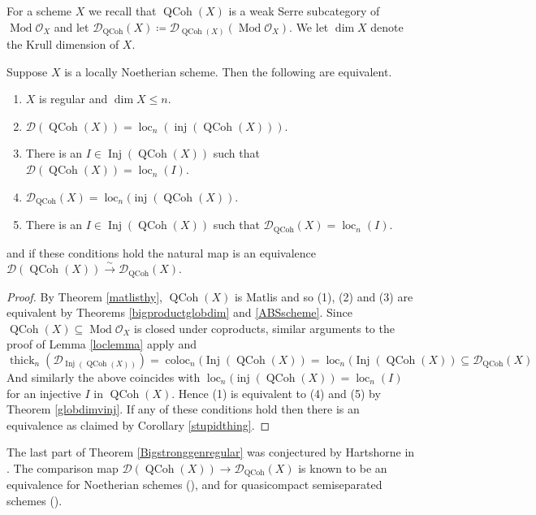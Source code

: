 \documentclass[12pt,oneside]{amsart}
\DeclareMathOperator*{\Inj}{Inj}
\DeclareMathOperator{\coloc}{coloc}
\DeclareMathOperator{\loc}{loc}
\DeclareMathOperator{\thick}{thick}
\DeclareMathOperator{\Mod}{Mod}
\DeclareMathOperator{\QCoh}{QCoh}
\DeclareMathOperator{\inj}{inj}
\begin{document}
For a scheme $X$ we recall that $\QCoh(X)$ is a weak Serre subcategory of $\Mod \mathcal{O}_X$ and let $\mathcal{D}_{\QCoh}(X) \coloneq \mathcal{D}_{\QCoh(X)}(\Mod \mathcal{O}_X)$. We let $\dim X$ denote the Krull dimension of $X$. 


\begin{theorem} \label{Bigstronggenregular}
Suppose $X$ is a locally Noetherian scheme. Then the following are equivalent.

\begin{enumerate}
\item $X$ is regular and $\dim X \leq n$.
\item $\mathcal{D}(\QCoh(X)) = \loc_n(\inj(\QCoh(X)))$.
\item There is an $I \in \Inj(\QCoh(X)) $ such that $\mathcal{D}(\QCoh(X)) = \loc_n(I)$.
\item $\mathcal{D}_{\QCoh}(X) = \loc_n(\inj(\QCoh(X))$.
\item There is an $I \in \Inj(\QCoh(X))$ such that $\mathcal{D}_{\QCoh}(X) = \loc_n(I)$.
\end{enumerate}
and if these conditions hold the natural map is an equivalence $\mathcal{D}(\QCoh(X)) \xrightarrow{\sim} \mathcal{D}_{\QCoh}(X)$.

\end{theorem}

\begin{proof}
By Theorem \ref{matlisthy}, $\QCoh(X)$ is Matlis and so (1), (2) and (3) are equivalent by Theorems \ref{bigproductglobdim} and \ref{ABSscheme}. Since $\QCoh(X) \subseteq \Mod \mathcal{O}_X$ is closed under coproducts, similar arguments to the proof of Lemma \ref{loclemma} apply and 
\[
\thick_n(\mathcal{D}_{\Inj(\QCoh(X))}) = \coloc_n(\Inj(\QCoh(X)) = \loc_n(\Inj(\QCoh(X)) \subseteq \mathcal{D}_{\QCoh}(X)
\]
And similarly the above coincides with $\loc_n(\inj(\QCoh(X)) = \loc_n(I)$ for an injective $I$ in $\QCoh(X)$. Hence (1) is equivalent to (4) and (5) by Theorem \ref{globdimvinj}. If any of these conditions hold then there is an equivalence as claimed by Corollary \ref{stupidthing}.
\end{proof}

\begin{remark}
The last part of Theorem \ref{Bigstronggenregular} was conjectured by Hartshorne in \cite[pp.\ 136]{Har66}.
The comparison map $\mathcal{D}(\QCoh(X)) \to \mathcal{D}_{\QCoh}(X)$ is known to be an equivalence for Noetherian schemes (\cite[Tag 09T4]{stacks-project}), and for quasicompact semiseparated schemes (\cite[Corollary 5.5]{BN93}). 
\end{remark}
\end{document}

